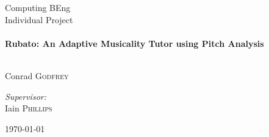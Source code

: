 \begin{titlepage}
    \begin{center}
        \large Computing BEng \\[0.5cm]
        \large Individual Project \\[0.5cm]
        \HRule \\[0.4cm]
        {\huge \bfseries Rubato: An Adaptive Musicality Tutor using Pitch Analysis \\[0.4cm]}
        \HRule \\[1.5cm]
            \begin{flushleft}
                \large               
                Conrad \textsc{Godfrey}\\
            \end{flushleft}
            \begin{flushright}
                \large
                \emph{Supervisor:}\\
                Iain \textsc{Phillips}
            \end{flushright}
        \vfill
        {\large \today}
    \end{center}
\end{titlepage}
